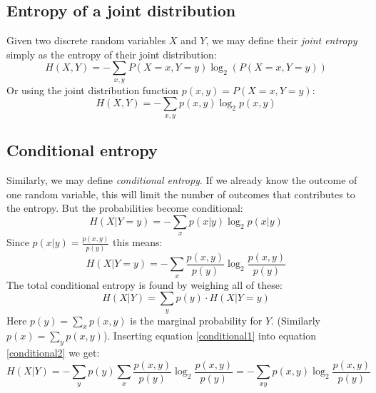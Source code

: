 \documentclass[12pt, a4paper]{article}
\numberwithin{equation}{section}
\begin{document}
\subsection{Entropy of a joint distribution}
Given two discrete random variables $X$ and $Y$, we may define their \textit{joint entropy} simply as the entropy of their joint distribution:
\begin{equation}
H(X,Y)=-\sum_{x,y}P(X=x, Y=y)\log_2\left(P(X=x, Y=y)\right)
\end{equation}
Or using the joint distribution function $p(x,y)=P(X=x, Y=y)$:
\begin{equation}
H(X,Y)=-\sum_{x,y}p(x,y)\log_2 p(x,y)
\end{equation}

\subsection{Conditional entropy}
Similarly, we may define \textit{conditional entropy}. If we already know the outcome of one random variable, this will limit the number of outcomes that contributes to the entropy. But the probabilities become conditional:
\begin{equation}
H(X|Y=y)=-\sum_x p(x|y)\log_2 p(x|y)
\end{equation}
Since $p(x|y)=\frac{p(x,y)}{p(y)}$ this means:
\begin{equation}
\label{conditional1}
H(X|Y=y)=-\sum_x\frac{p(x,y)}{p(y)}\log_2\frac{p(x,y)}{p(y)}
\end{equation}
The total conditional entropy is found by weighing all of these:
\begin{equation}
\label{conditional2}
H(X|Y)=\sum_y p(y)\cdot H(X|Y=y)
\end{equation}
Here $p(y)=\sum_x p(x,y)$ is the marginal probability for $Y$. (Similarly $p(x)=\sum_y p(x,y)$). Inserting equation \ref{conditional1} into equation \ref{conditional2} we get:
\begin{equation}
H(X|Y)=-\sum_y p(y)\sum_x \frac{p(x,y)}{p(y)}\log_2\frac{p(x,y)}{p(y)}=-\sum_{xy}p(x,y)\log_2\frac{p(x,y)}{p(y)}
\end{equation}
\end{document}
